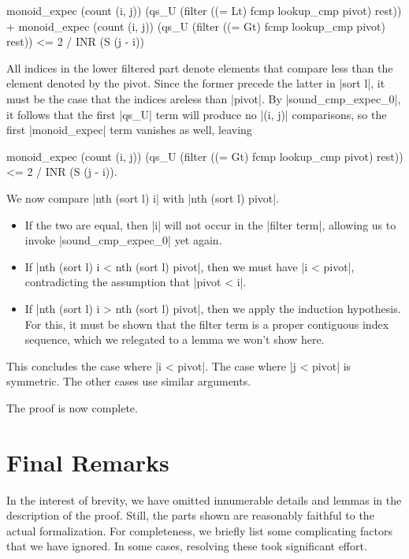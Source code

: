 \documentclass[runningheads]{llncs}
\begin{document}
\begin{code}
monoid_expec (count (i, j))
  (qs_U (filter ((= Lt) fcmp lookup_cmp pivot) rest)) +
monoid_expec (count (i, j))
  (qs_U (filter ((= Gt) fcmp lookup_cmp pivot) rest)) <= 2 / INR (S (j - i))
\end{code}
All indices in the lower filtered part denote elements that compare less than the element denoted by the pivot. Since the former precede the latter in |sort l|, it must be the case that the indices areless than |pivot|. By |sound_cmp_expec_0|, it follows that the first |qs_U| term will produce no |(i, j)| comparisons, so the first |monoid_expec| term vanishes as well, leaving
\begin{code}
monoid_expec (count (i, j))
  (qs_U (filter ((= Gt) fcmp lookup_cmp pivot) rest)) <= 2 / INR (S (j - i)).
\end{code}
We now compare |nth (sort l) i| with |nth (sort l) pivot|.
\begin{itemize}
\item If the two are equal, then |i| will not occur in the |filter term|, allowing us to invoke |sound_cmp_expec_0| yet again.
\item If |nth (sort l) i < nth (sort l) pivot|, then we must have |i < pivot|, contradicting the assumption that |pivot < i|.
\item If |nth (sort l) i > nth (sort l) pivot|, then we apply the induction hypothesis. For this, it must be shown that the filter term is a proper contiguous index sequence, which we relegated to a lemma we won't show here.
\end{itemize}
This concludes the case where |i < pivot|. The case where |j < pivot| is symmetric. The other cases use similar arguments.

The proof is now complete.

\section{Final Remarks}
\label{conclusion}

In the interest of brevity, we have omitted innumerable details and lemmas in the description of the proof. Still, the parts shown are reasonably faithful to the actual formalization. For completeness, we briefly list some complicating factors that we have ignored. In some cases, resolving these took significant effort.
\end{document}
